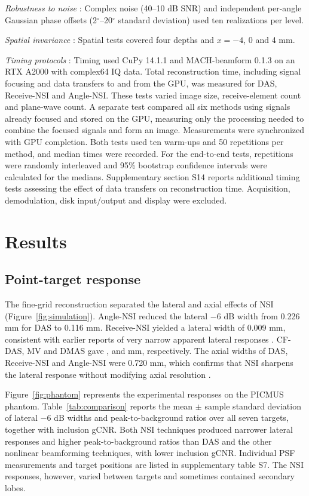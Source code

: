 \documentclass{iopjournal}
\providecommand{\revstart}{}
\providecommand{\revstop}{}
\begin{document}
\textit{Robustness to noise} : Complex noise (40--10 dB SNR) and independent per-angle Gaussian phase offsets (2$^\circ$--20$^\circ$ standard deviation) used ten realizations per level.

\textit{Spatial invariance} : Spatial tests covered four depths and $x=-4$, 0 and 4 mm.


\textit{Timing protocols} : Timing used CuPy 14.1.1 and MACH-beamform 0.1.3 on an RTX A2000 with complex64 IQ data. \revstart Total reconstruction time, including signal focusing and data transfers to and from the GPU, was measured for DAS, Receive-NSI and Angle-NSI. These tests varied image size, receive-element count and plane-wave count. A separate test compared all six methods using signals already focused and stored on the GPU, measuring only the processing needed to combine the focused signals and form an image. Measurements were synchronized with GPU completion. Both tests used ten warm-ups and 50 repetitions per method, and median times were recorded. For the end-to-end tests, repetitions were randomly interleaved and 95\% bootstrap confidence intervals were calculated for the medians. Supplementary section S14 reports additional timing tests assessing the effect of data transfers on reconstruction time. \revstop Acquisition, demodulation, disk input/output and display were excluded.

\section{Results}

\subsection{Point-target response}

The fine-grid reconstruction separated the lateral and axial effects of NSI
(Figure~\ref{fig:simulation}). Angle-NSI reduced the lateral $-6$ dB width from 0.226 mm for DAS to 0.116 mm.
Receive-NSI yielded a lateral width of 0.009 mm,
consistent with earlier reports of very narrow apparent lateral responses
\citep{agarwal2019improving}. \revstart CF-DAS, MV and DMAS gave
\SimulationCfWidth{}, \SimulationMvWidth{} and \SimulationDmasWidth{} mm,
respectively.\revstop{} The axial widths of DAS,
Receive-NSI and Angle-NSI were 0.720 mm, which confirms that NSI sharpens the lateral response without modifying axial resolution \citep{reeg_improving_2015}. 

\revstart Figure~\ref{fig:phantom} represents the experimental responses on the PICMUS phantom.
Table~\ref{tab:comparison} reports the mean $\pm$ sample standard deviation
of lateral $-6$ dB widths and peak-to-background ratios over all seven targets,
together with inclusion gCNR. Both NSI techniques produced narrower lateral
responses and higher peak-to-background ratios than DAS and the other nonlinear beamforming techniques, with lower inclusion
gCNR. Individual PSF measurements and target positions are listed in
supplementary table S7. The NSI responses, however,
varied between targets and sometimes contained secondary lobes.\revstop
\end{document}
